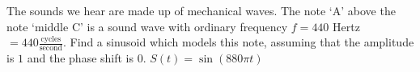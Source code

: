 { The sounds we hear are made up of mechanical waves.  The note `A' above the note `middle C' is a sound wave with ordinary frequency $f = 440$ Hertz $= 440 \frac{\text{cycles}}{\text{second}}$.  Find a sinusoid which models this note, assuming that the amplitude is $1$ and the phase shift is $0$.}
{$S(t) = \sin\left(880\pi t\right)$}

